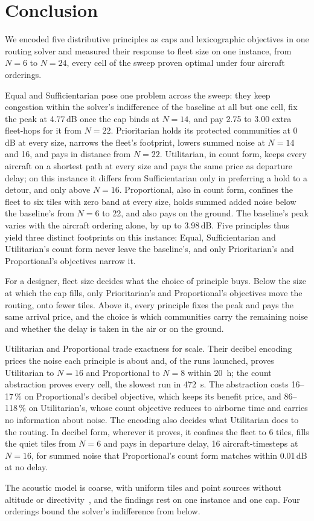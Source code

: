 \section{Conclusion}
\label{sec:conclusion}

We encoded five distributive principles as caps and lexicographic objectives in one
routing solver and measured their response to fleet size on one instance, from $N=6$ to
$N=24$, every cell of the sweep proven optimal under four aircraft orderings.

Equal and Sufficientarian pose one problem across the sweep: they keep congestion within the
solver's indifference of the baseline at all but one cell, fix the peak at 4.77\,dB once
the cap binds at $N=14$, and pay 2.75 to 3.00 extra fleet-hops for it from $N=22$.
Prioritarian holds its protected communities at 0\,dB at every size, narrows the fleet's
footprint, lowers summed noise at $N=14$ and 16, and pays in distance from $N=22$.
Utilitarian, in count form, keeps every aircraft on a shortest path at every size and pays
the same price as departure delay; on this instance it differs from Sufficientarian only
in preferring a hold to a detour, and only above $N=16$. Proportional, also in count form, confines the fleet
to six tiles with zero
band at every size, holds summed added noise below the baseline's from $N=6$ to 22, and
also pays on the ground. The baseline's peak varies with the aircraft ordering alone, by
up to 3.98\,dB. Five principles thus yield three distinct footprints on this
instance: Equal, Sufficientarian and Utilitarian's count form never leave the baseline's,
and only Prioritarian's and Proportional's objectives narrow it.

For a designer, fleet size decides what the choice of principle buys. Below the size at
which the cap fills, only Prioritarian's and Proportional's objectives move the routing,
onto fewer tiles. Above it, every principle fixes the peak and pays the same arrival
price, and the choice is which communities carry the remaining noise and whether the
delay is taken in the air or on the ground.

Utilitarian and Proportional trade exactness for scale. Their decibel encoding prices the
noise each principle is about and, of the runs launched, proves Utilitarian to $N=16$ and
Proportional to $N=8$ within \SI{20}{\hour}; the count abstraction proves every cell, the slowest run in
\SI{472}{\second}. The abstraction costs 16--17\,\% on Proportional's decibel objective,
which keeps its benefit price, and 86--118\,\% on Utilitarian's, whose count objective
reduces to airborne time and carries no information about noise. The encoding also
decides what Utilitarian does to the routing. In decibel form, wherever it proves, it
confines the fleet to 6 tiles, fills the quiet tiles from $N=6$ and pays in departure
delay, 16 aircraft-timesteps at $N=16$, for summed noise that Proportional's count form
matches within 0.01\,dB at no delay.

The acoustic model is coarse, with uniform tiles and point sources without altitude or
directivity~\cite{nasaUAMnoise2020}, and the findings rest on one instance and one cap.
Four orderings bound the solver's indifference from below.
